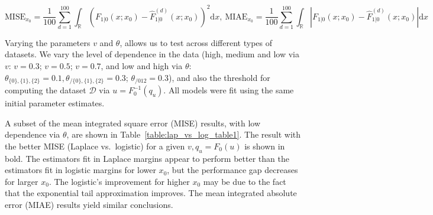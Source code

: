 \documentclass[11pt,twoside,openany]{book}
\newcommand{\md}{\mathrm{d}}
\newcommand{\reals}{\mathbb{R}}
\newcommand{\D}{\mathcal{D}}
\numberwithin{Theorem}{chapter}
\numberwithin{Definition}{chapter}
\numberwithin{Lemma}{chapter}
\numberwithin{Algorithm}{chapter}
\numberwithin{equation}{chapter}
\begin{document}
\begin{equation}\label{eq:miseandmiae}
  \text{MISE}_{x_0}=\frac{1}{100}\sum_{d=1}^{100}\int_\reals \left(F_{1|0}(x;x_0) - \hat F_{1|0}^{(d)}(x;x_0)\right)^2\md x,\ \text{MIAE}_{x_0}=\frac{1}{100}\sum_{d=1}^{100}\int_\reals \left|F_{1|0}(x;x_0) - \hat F_{1|0}^{(d)}(x;x_0)\right|\md x
  \end{equation}

Varying the parameters $v$ and $\theta$, allows us to test across
different types of datasets.
We vary the level of dependence in the data (high, medium and low via $v$: $v=0.3$; $v=0.5$; $v=0.7$,
and low and high via $\theta$: $\theta_{\{0\},\{1\},\{2\}}=0.1,\theta_{/\{0\},\{1\},\{2\}}=0.3$; $\theta_{/012}=0.3$),
and also the threshold for computing the dataset $\D$ via $u=F_0^{-1}(q_u)$.
All models were fit using the same initial parameter estimates.

\begin{table}[htp]
  \centering
  \caption{Mean integrated square errors $\pm$ 1 s.d.\ for Laplace and logistic marginals, and for different
parameter combinations. MISEs are multiplied by 100 for readability.\label{table:lap_vs_log_table1}}
\end{table}


A subset of the mean integrated square error (MISE) results, with
low dependence via $\theta$, are shown in
Table~\ref{table:lap_vs_log_table1}. The result with the better MISE (Laplace
vs.\ logistic) for a given $v,q_u = F_0(u)$ is shown in bold. The estimators fit
in Laplace margins appear to perform better than the estimators fit in logistic
margins for lower $x_0$, but the performance gap decreases for larger $x_0$.
The logistic's improvement for higher $x_0$ may be due to the fact that the
exponential tail approximation improves.
The mean integrated absolute error (MIAE) results yield similar conclusions.
\end{document}
